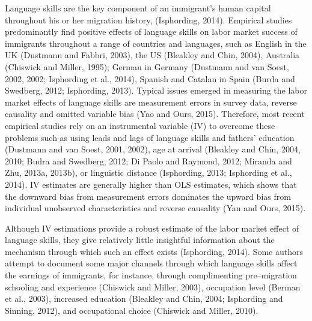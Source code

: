 \documentclass[12pt,a4paper]{article}
\begin{document}
Language skills are the key component of an immigrant's human capital throughout his or her migration history,  (Isphording, 2014). Empirical studies predominantly find positive effects of language skills on labor market success of immigrants throughout a range of countries and languages, such as English in the UK (Dustmann and Fabbri, 2003), the US (Bleakley and Chin, 2004), Australia (Chiswick and Miller, 1995); German in Germany (Dustmann and van Soest, 2002, 2002; Isphording et al., 2014), Spanish and Catalan in Spain (Burda and Swedberg, 2012; Isphording, 2013). Typical issues emerged in measuring the labor market effects of language skills are measurement errors in survey data, reverse causality and omitted variable bias (Yao and Ours, 2015). Therefore, most recent empirical studies rely on an instrumental variable (IV) to overcome these problems such as using leads and lags of language skills and fathers' education (Dustmann and van Soest, 2001, 2002), age at arrival (Bleakley and Chin, 2004, 2010; Budra and Swedberg, 2012; Di Paolo and Raymond, 2012; Miranda and Zhu, 2013a, 2013b), or linguistic distance (Isphording, 2013; Isphording et al., 2014). IV estimates are generally higher than OLS estimates, which shows that the downward bias from measurement errors dominates the upward bias from individual unobserved characteristics and reverse causality (Yan and Ours, 2015).

Although IV estimations provide a robust estimate of the labor market effect of language skills, they give relatively little insightful information about the mechanism through which such an effect exists (Isphording, 2014). Some authors attempt to document some major channels through which language skills affect the earnings of immigrants, for instance, through complimenting pre--migration schooling and experience (Chiswick and Miller, 2003), occupation level (Berman et al., 2003), increased education (Bleakley and Chin, 2004; Isphording and Sinning, 2012), and occupational choice (Chiswick and Miller, 2010).


\end{document}
